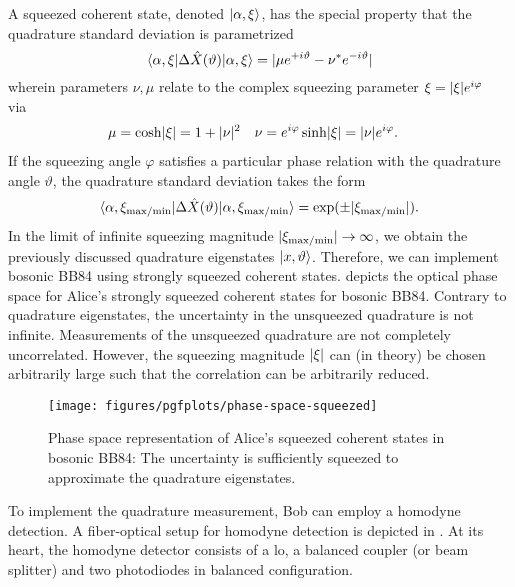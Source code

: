A squeezed coherent state, denoted $\lvert\alpha,\xi\rangle$, has the special property that the quadrature standard deviation is parametrized~\cite[p.~95]{Vogel2006}
\begin{equation}
	\langle\alpha,\xi\rvert{\Delta\hat{X}(\vartheta)}\lvert\alpha,\xi\rangle
	=
	\lvert\mu e^{+i\vartheta}-\nu^* e^{-i\vartheta}\rvert
	\label{eq:squeezed_quadrature_std}
\end{equation}
wherein parameters $\nu,\mu$ relate to the complex squeezing parameter $\xi=\lvert\xi\rvert e^{i\varphi}$ via~\cite[p.~90]{Vogel2006}
\begin{align}
	\mu
	&=
	\cosh\lvert\xi\rvert
	=
	1+\lvert\nu\rvert^2
	&
	\nu
	&=
	e^{i\varphi}
	\sinh\lvert\xi\rvert
	=
	\lvert\nu\rvert
	e^{i\varphi}
	\label{eq:squeezing_parameters}
	.
\end{align}
If the squeezing angle $\varphi$ satisfies a particular phase relation with the quadrature angle $\vartheta$, the quadrature standard deviation takes the form~\cite[p.~96]{Vogel2006}
\begin{equation}
	\langle\alpha,\xi_{\text{max}/\text{min}}\rvert
	\Delta\hat{X}(\vartheta)
	\lvert\alpha,\xi_{\text{max}/\text{min}}\rangle
	=
	\exp(\pm\lvert\xi_{\text{max}/\text{min}}\rvert)
	.
\end{equation}
In the limit of infinite squeezing magnitude $\lvert\xi_{\text{max}/\text{min}}\rvert\to\infty$, we obtain the previously discussed quadrature eigenstates $\lvert x,\vartheta\rangle$.
Therefore, we can implement bosonic BB84 using strongly squeezed coherent states.
 depicts the optical phase space for Alice's strongly squeezed coherent states for bosonic BB84.
Contrary to quadrature eigenstates, the uncertainty in the unsqueezed quadrature is not infinite.
Measurements of the unsqueezed quadrature are not completely uncorrelated.
However, the squeezing magnitude $\lvert\xi\rvert$ can (in theory) be chosen arbitrarily large such that the correlation can be arbitrarily reduced.
\begin{figure}[htb]
	\centering
	\texttt{[image: figures/pgfplots/phase-space-squeezed]}
	\caption{Phase space representation of Alice's squeezed coherent states in bosonic BB84: The uncertainty is sufficiently squeezed to approximate the quadrature eigenstates.}\label{fig:phase_space_squeezed}
\end{figure}
To implement the quadrature measurement, Bob can employ a homodyne detection.
A fiber-optical setup for homodyne detection is depicted in .
At its heart, the homodyne detector consists of a \gls{lo}, a balanced coupler (or beam splitter) and two photodiodes in balanced configuration.
